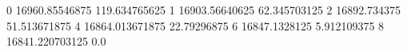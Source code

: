 0 16960.85546875 119.634765625
1 16903.56640625 62.345703125
2 16892.734375 51.513671875
4 16864.013671875 22.79296875
6 16847.1328125 5.912109375
8 16841.220703125 0.0
